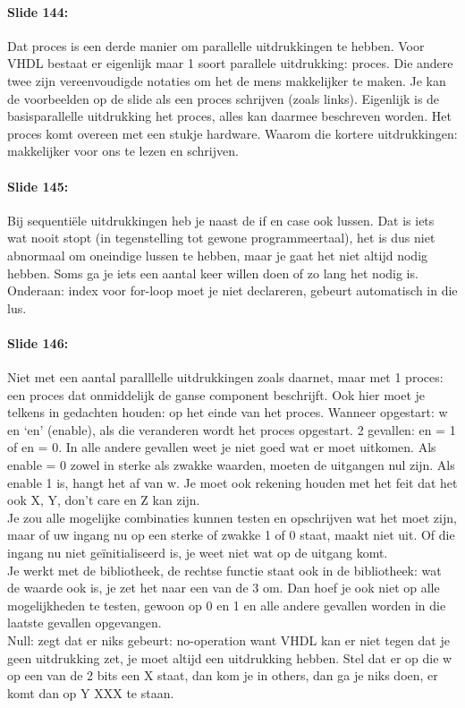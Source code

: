 \documentclass[10pt,a4paper]{book}
\begin{document}
\paragraph{Slide 144:} Dat proces is een derde manier om parallelle uitdrukkingen te hebben. Voor VHDL bestaat er eigenlijk maar 1 soort parallele uitdrukking: proces. Die andere twee zijn vereenvoudigde notaties om het de mens makkelijker te maken. Je kan de voorbeelden op de slide als een proces schrijven (zoals links). Eigenlijk is de basisparallelle uitdrukking het proces, alles kan daarmee beschreven worden. Het proces komt overeen met een stukje hardware. Waarom die kortere uitdrukkingen: makkelijker voor ons te lezen en schrijven. 

\paragraph{Slide 145:} Bij sequenti\"ele uitdrukkingen heb je naast de if en case ook lussen. Dat is iets wat nooit stopt (in tegenstelling tot gewone programmeertaal), het is dus niet abnormaal om oneindige lussen te hebben, maar je gaat het niet altijd nodig hebben. Soms ga je iets een aantal keer willen doen of zo lang het nodig is. Onderaan: index voor for-loop moet je niet declareren, gebeurt automatisch in die lus.

\paragraph{Slide 146:} Niet met een aantal paralllelle uitdrukkingen zoals daarnet, maar met 1 proces: een proces dat onmiddelijk de ganse component beschrijft. Ook hier moet je telkens in gedachten houden: op het einde van het proces. Wanneer opgestart: w en `en' (enable), als die veranderen wordt het proces opgestart. 2 gevallen: en = 1 of en = 0. In alle andere gevallen weet je niet goed wat er moet uitkomen. Als enable = 0 zowel in sterke als zwakke waarden, moeten de uitgangen nul zijn. Als enable 1 is, hangt het af van w. Je moet ook rekening houden met het feit dat het ook X, Y, don't care en Z kan zijn.\\
Je zou alle mogelijke combinaties kunnen testen en opschrijven wat het moet zijn, maar of uw ingang nu op een sterke of zwakke 1 of 0 staat, maakt niet uit. Of die ingang nu niet ge\"initialiseerd is, je weet niet wat op de uitgang komt.\\
Je werkt met de bibliotheek, de rechtse functie staat ook in de bibliotheek: wat de waarde ook is, je zet het naar een van de 3 om. Dan hoef je ook niet op alle mogelijkheden te testen, gewoon op 0 en 1 en alle andere gevallen worden in die laatste gevallen opgevangen.\\
Null: zegt dat er niks gebeurt: no-operation want VHDL kan er niet tegen dat je geen uitdrukking zet, je moet altijd een uitdrukking hebben. Stel dat er op die w op een van de 2 bits een X staat, dan kom je in others, dan ga je niks doen, er komt dan op Y XXX te staan.
\end{document}
